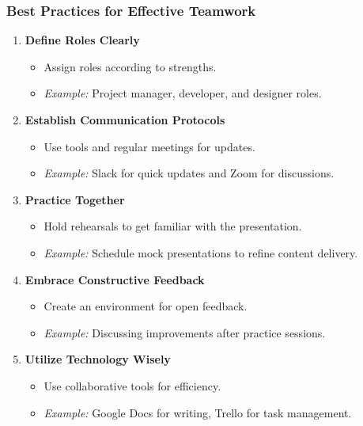 \documentclass[aspectratio=169]{beamer}
\begin{document}
\begin{frame}[fragile]
    \frametitle{Best Practices for Effective Teamwork}
    \begin{enumerate}
        \item \textbf{Define Roles Clearly} 
            \begin{itemize}
                \item Assign roles according to strengths.
                \item \textit{Example:} Project manager, developer, and designer roles.
            \end{itemize}

        \item \textbf{Establish Communication Protocols}
            \begin{itemize}
                \item Use tools and regular meetings for updates.
                \item \textit{Example:} Slack for quick updates and Zoom for discussions.
            \end{itemize}

        \item \textbf{Practice Together}
            \begin{itemize}
                \item Hold rehearsals to get familiar with the presentation.
                \item \textit{Example:} Schedule mock presentations to refine content delivery.
            \end{itemize}

        \item \textbf{Embrace Constructive Feedback}
            \begin{itemize}
                \item Create an environment for open feedback.
                \item \textit{Example:} Discussing improvements after practice sessions.
            \end{itemize}

        \item \textbf{Utilize Technology Wisely}
            \begin{itemize}
                \item Use collaborative tools for efficiency.
                \item \textit{Example:} Google Docs for writing, Trello for task management.
            \end{itemize}
    \end{enumerate}
\end{frame}
\end{document}
